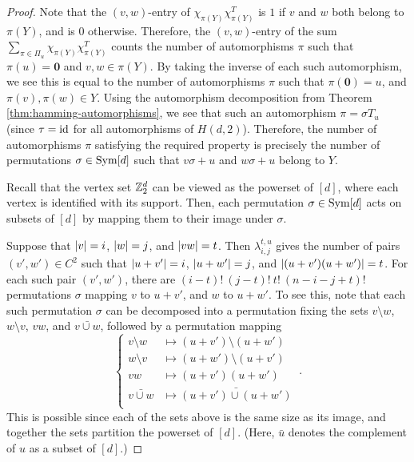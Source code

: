 \documentclass{report}
\newcommand{\wt}[1]{\abs{ #1 }}
\newcommand{\vzero}{\mathbf{0}}
\newcommand{\chipiY}{\chi_{\pi(Y)}}
\begin{document}
    \begin{proof}

      Note that the $(v, w)$-entry of $\chipiY \chipiY^T$ is $1$ if $v$ and $w$
      both belong to $\pi(Y)$, and is $0$ otherwise.  Therefore, the $(v,
      w)$-entry of the sum $\sum_{\pi \in \Pi_u} \chipiY \chipiY^T$ counts the
      number of automorphisms $\pi$ such that $\pi(u) = \vzero$ and $v, w \in
      \pi(Y)$.  By taking the inverse of each such automorphism, we see this is
      equal to the number of automorphisms $\pi$ such that $\pi(\vzero) = u$,
      and $\pi(v), \pi(w) \in Y$.  Using the automorphism decomposition from
      Theorem \ref{thm:hamming-automorphisms}, we see that such an
      automorphism $\pi = \sigma T_u$ (since $\tau = \operatorname{id}$ for all automorphisms
      of $H(d, 2)$).  Therefore, the number of automorphisms $\pi$ satisfying
      the required property is precisely the number of permutations $\sigma \in
      \operatorname{Sym}[d]$ such that $v\sigma + u$ and $w\sigma +u$ belong to $Y$.

      Recall that the vertex set $\mathbb{Z}_2^d$ can be viewed as the powerset of
      $[d]$, where each vertex is identified with its support.  Then, each
      permutation $\sigma \in \operatorname{Sym}[d]$ acts on subsets of $[d]$ by mapping them
      to their image under $\sigma$.

      Suppose that $\wt{v} = i$, $\wt{w} = j$, and $\wt{vw} = t$.  Then
      $\lambda_{i, j}^{t, u}$ gives the number of pairs $(v', w') \in C^2$ such
      that $\wt{u+v'} = i$, $\wt{u+w'} = j$, and $\wt{(u+v')(u+w')} = t$.  For
      each such pair $(v', w')$, there are $(i-t)!\ (j-t)!\ t!\ (n-i-j+t)!$
      permutations $\sigma$ mapping $v$ to $u + v'$, and $w$ to $u + w'$.  To
      see this, note that each such permutation $\sigma$ can be decomposed into
      a permutation fixing the sets $v \setminus w$, $w \setminus v$, $vw$, and
      $\bar{v \cup w}$, followed by a permutation mapping
      $$
      \begin{cases}
        v \setminus w &\mapsto (u+v') \setminus (u+w') \\
        w \setminus v &\mapsto (u+w') \setminus (u+v') \\
        vw            &\mapsto (u+v')(u+w') \\
        \bar{v \cup w}      &\mapsto \bar{(u+v') \cup (u+w')} \\
      \end{cases} \ .
      $$
      This is possible since each of the sets above is the same size as its
      image, and together the sets partition the powerset of $[d]$.  (Here,
      $\bar{u}$ denotes the complement of $u$ as a subset of $[d]$.)

    \end{proof}
\end{document}

